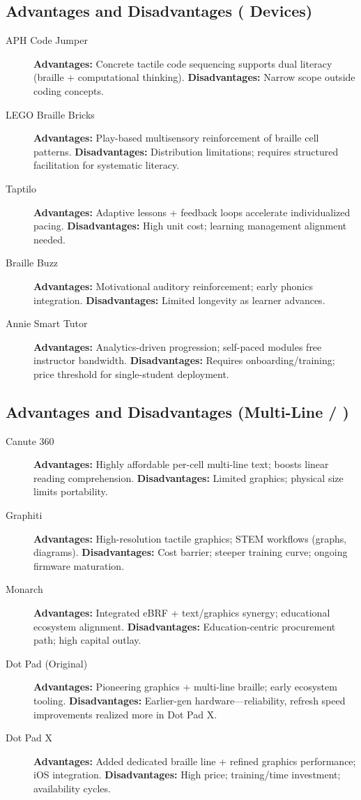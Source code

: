 \subsection*{Advantages and Disadvantages ( Devices)}
\begin{description}
	\item[APH Code Jumper] \textbf{Advantages:} Concrete tactile code sequencing supports dual literacy (braille + computational thinking). \textbf{Disadvantages:} Narrow scope outside coding concepts.
	\item[LEGO Braille Bricks] \textbf{Advantages:} Play-based multisensory reinforcement of braille cell patterns. \textbf{Disadvantages:} Distribution limitations; requires structured facilitation for systematic literacy.
	\item[Taptilo] \textbf{Advantages:} Adaptive lessons + feedback loops accelerate individualized pacing. \textbf{Disadvantages:} High unit cost; learning management alignment needed.
	\item[Braille Buzz] \textbf{Advantages:} Motivational auditory reinforcement; early phonics integration. \textbf{Disadvantages:} Limited longevity as learner advances.
	\item[Annie Smart Tutor] \textbf{Advantages:} Analytics-driven progression; self-paced modules free instructor bandwidth. \textbf{Disadvantages:} Requires onboarding/training; price threshold for single-student deployment.
\end{description}

\subsection*{Advantages and Disadvantages (Multi-Line / )}
\begin{description}
	\item[Canute 360] \textbf{Advantages:} Highly affordable per-cell multi-line text; boosts linear reading comprehension. \textbf{Disadvantages:} Limited graphics; physical size limits portability.
	\item[Graphiti] \textbf{Advantages:} High-resolution tactile graphics; STEM workflows (graphs, diagrams). \textbf{Disadvantages:} Cost barrier; steeper training curve; ongoing firmware maturation.
	\item[Monarch] \textbf{Advantages:} Integrated eBRF + text/graphics synergy; educational ecosystem alignment. \textbf{Disadvantages:} Education-centric procurement path; high capital outlay.
	\item[Dot Pad (Original)] \textbf{Advantages:} Pioneering graphics + multi-line braille; early ecosystem tooling. \textbf{Disadvantages:} Earlier-gen hardware—reliability, refresh speed improvements realized more in Dot Pad X.
	\item[Dot Pad X] \textbf{Advantages:} Added dedicated braille line + refined graphics performance; iOS integration. \textbf{Disadvantages:} High price; training/time investment; availability cycles.
\end{description}


